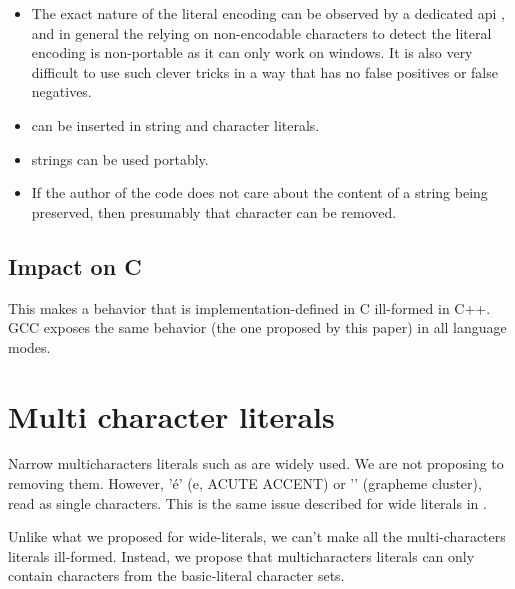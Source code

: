 \documentclass{wg21}
\begin{document}
\begin{itemize}
    \item The exact nature of the literal encoding can be observed by a dedicated api , and in general the relying on non-encodable characters to detect the literal encoding
is non-portable as it can only work on windows. It is also very difficult to use such clever tricks in a way that has no false positives or false negatives.
    \item {} can be inserted in string and character literals.
    \item {} strings can be used portably.
    \item If the author of the code does not care about the content of a string being preserved, then presumably that character can be removed.
\end{itemize}

\subsection{Impact on C}

This makes a behavior that is implementation-defined in C ill-formed in C++.
GCC exposes the same behavior (the one proposed by this paper) in all language modes.

\section{Multi character literals}

Narrow multicharacters literals such as  are widely used. We are not proposing to removing them.
However, 'é' (e, ACUTE ACCENT) or '' (grapheme cluster), read as single characters.
This is the same issue described for wide literals in .

Unlike what we proposed for wide-literals, we can't make all the multi-characters literals ill-formed.
Instead, we propose that multicharacters literals can only contain characters from the basic-literal character sets.
\end{document}
